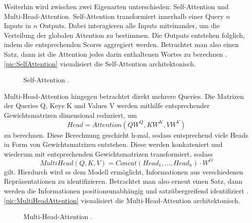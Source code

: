 \noindent
Weiterhin wird zwischen zwei Eigenarten unterschieden: Self-Attention und Multi-Head-Attention. Self-Attention transformiert innerhalb einer Query $n$ Inputs in $n$ Outputs. Dabei interagieren alle Inputs miteinander, um die Verteilung der globalen Attention zu bestimmen. Die Outputs entstehen folglich, indem die entsprechenden Scores aggregiert werden. Betrachtet man also einen Satz, dann ist die Attention jedes darin enthaltenen Wortes zu berechnen \cite{KAR19}. \autoref{pic:SelfAttention} visualisiert die Self-Attention architektonisch.

\begin{figure}[h!]
  \centering
  \caption{Self-Attention \cite[S.~400]{ZHA20}.}
  \label{pic:SelfAttention}
\end{figure}

\noindent
Multi-Head-Attention hingegen betrachtet direkt mehrere Queries. Die Matrizen der Queries Q, Keys K und Values V werden mithilfe entsprechender Gewichtsmatrizen dimensional reduziert, um $$Head = Attention(QW^Q, KW^K, VW^V)$$ zu berechnen. Diese Berechnung geschieht h-mal, sodass entsprechend viele Heads in Form von Gewichtsmatrizen entstehen. Diese werden konkateniert und wiederum mit entsprechenden Gewichtsmatrizen transformiert, sodass $$MultiHead(Q,K,V) = Concat(Head_1, ..., Head_h) \cdot W^O$$ gilt. Hierdurch wird es dem Modell ermöglicht, Informationen aus verschiedenen Repräsentationen zu identifizieren. Betrachtet man also erneut einen Satz, dann werden die Informationen positionsunabhängig und satzübergreifend identifiziert \cite{VAS17}. \autoref{pic:MultiHeadAttention} visualisiert die Multi-Head-Attention architektonisch.

\begin{figure}[h!]
  \centering
  \caption{Multi-Head-Attention \cite[S.~400]{ZHA20}.}
  \label{pic:MultiHeadAttention}
\end{figure}


